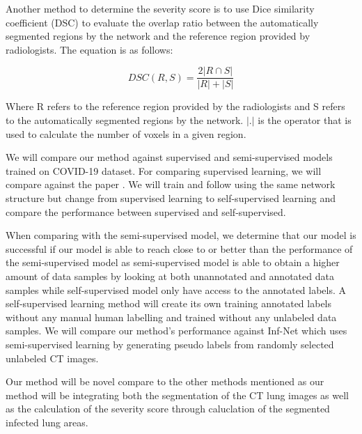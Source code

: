 Another method to determine the severity score is to use Dice similarity coefficient (DSC) \cite{ref12}  to evaluate the overlap ratio between the automatically segmented regions by the network and the reference region provided by radiologists. The equation is as follows:

\begin{equation}
DSC(R,S)=\frac{2|R\cap S|}{|R|+|S|}
\end{equation}

Where R refers to the reference region provided by the radiologists and S refers to the automatically segmented regions by the network. $|.|$
is the operator that is used to calculate the number of voxels in a given region.

We will compare our method against supervised and semi-supervised \cite{ref13,ref14} models trained on COVID-19 dataset. For comparing supervised learning, we will compare against the paper \cite{ref13}. We will train and follow using the same network structure but change from supervised learning to self-supervised learning and compare the performance between supervised and self-supervised.

When comparing with the semi-supervised model, we determine that our model is successful if our model is able to reach close to or better than the performance of the semi-supervised model as semi-supervised model is able to obtain a higher amount of data samples by looking at both unannotated and annotated data samples while self-supervised model only have access to the annotated labels. A self-supervised learning method will create its own training annotated labels without any manual human labelling and trained without any unlabeled data samples. We will compare our method’s performance against Inf-Net \cite{ref14} which uses semi-supervised learning by generating pseudo labels from randomly selected unlabeled CT images.

Our method will be novel compare to the other methods mentioned as our method will be integrating both the segmentation of the CT lung images as well as the calculation of the severity score through caluclation of the segmented infected lung areas.